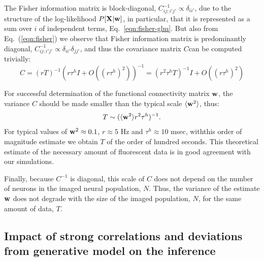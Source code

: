 The Fisher information matrix is block-diagonal, $C^{-1}_{ij;i'j'} \propto \delta_{ii'}$, due to the structure of the log-likelihood $P[{\bf X} | \mathbf{w}]$, in particular, that it is represented as a sum over $i$ of independent terms, Eq.~\eqref{eqn:fisher-glm}. But also from Eq.~(\eqref{eqn:fisher}) we observe that Fisher information matrix is predominantly diagonal, $C^{-1}_{ij;i'j'} \propto \delta_{ii'}\delta_{jj'}$, and thus the covariance matrix $C$can be computed trivially:
\begin{equation}
C = (rT)^{-1} (r \tau^h I + O((r \tau^h)^2))^{-1} =
(r^2 \tau^h T)^{-1} I + O((r \tau^h)^2)
\end{equation}

For successful determination of the functional connectivity matrix $\mathbf{w}$, the variance $C$ should be made smaller than the typical scale $\langle \mathbf{w}^2\rangle$, thus:
\begin{equation}
T \sim (\langle \bw^2 \rangle r^2  \tau^h)^{-1}.
\end{equation}
For typical values of $\mathbf{w}^2\approx 0.1$, $r\approx 5$ Hz and $ \tau^h \approx 10$ msec, withthis order of magnitude estimate we obtain $T$ of the order of hundred seconds. This theoretical estimate of the necessary amount of fluorescent data is in good agreement with our simulations.

Finally, because $C^{-1}$ is diagonal, this scale of $C$ does not depend on the number of neurons in the imaged neural population, $N$. Thus, the variance of the estimate $\mathbf{w}$ does not degrade with the size of the imaged population, $N$, for the same amount of data, $T$.

\subsection{Impact of strong correlations and deviations from generative model on the inference}


